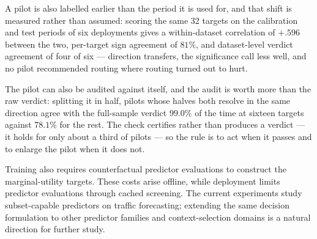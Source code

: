 A pilot is also labelled earlier than the period it is used for, and that
shift is measured rather than assumed: scoring the same 32 targets on the
calibration and test periods of six deployments gives a within-dataset
correlation of $+.596$ between the two, per-target sign agreement of $81\%$, and
dataset-level verdict agreement of four of six --- direction transfers, the
significance call less well, and no pilot recommended routing where routing
turned out to hurt.

The pilot can also be audited against itself, and the audit is worth more than
the raw verdict: splitting it in half, pilots whose halves both resolve in the
same direction agree with the full-sample verdict $99.0\%$ of the time at
sixteen targets against $78.1\%$ for the rest. The check certifies rather than
produces a verdict --- it holds for only about a third of pilots --- so the rule
is to act when it passes and to enlarge the pilot when it does not.

Training also requires counterfactual predictor evaluations to construct the
marginal-utility targets. These costs arise offline, while deployment limits
predictor evaluations through cached screening. The current experiments study
subset-capable predictors on traffic forecasting; extending the same decision
formulation to other predictor families and context-selection domains is a
natural direction for further study.
